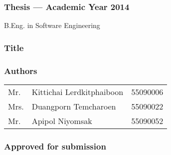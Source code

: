 \thispagestyle{empty}

\begin{flushleft}
\subsubsection{\Large{Thesis --- Academic Year 2014}}
B.Eng. in Software Engineering \kmitl

\vspace{2cm}

\subsubsection{\Large{Title}}
\dms

\vspace{1cm}
\subsubsection{\Large{Authors}}
\begin{tabular}{lll}
Mr. & Kittichai Lerdkitphaiboon & 55090006 \\
Mrs. & Duangporn Temcharoen & 55090022 \\
Mr. & Apipol Niyomsak & 55090052
\end{tabular}
\end{flushleft}

\vfill

\begin{flushright}
\subsubsection{\Large{Approved for submission}}
\vspace{1cm}
\vspace{1cm}
 \\
\vspace{1cm}
 \\
\end{flushright}